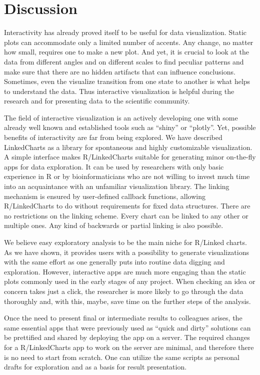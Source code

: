 \documentclass[twocolumn,10pt]{article}
\begin{document}
\section{Discussion}

Interactivity has already proved itself to be useful for data visualization. Static plots can accommodate only a limited number of accents. Any change, no matter how small, requires one to make a new plot. And yet, it is crucial to look at the data from different angles and on different scales to find peculiar patterns and make sure that there are no hidden artifacts that can influence conclusions. Sometimes, even the visualize transition from one state to another is what helps to understand the data. Thus interactive visualization is helpful during the research and for presenting data to the scientific community.

The field of interactive visualization is an actively developing one with some already well known and established tools such as ``shiny'' \citep{shiny} or ``plotly''\citep{sievert_2020}. Yet, possible benefits of interactivity are far from being explored. We have described LinkedCharts as a library for spontaneous and highly customizable visualization. A simple interface makes R/LinkedCharts suitable for generating minor on-the-fly apps for data exploration. It can be used by researchers with only basic experience in R or by bioinformaticians who are not willing to invest much time into an acquaintance with an unfamiliar visualization library. The linking mechanism is ensured by user-defined callback functions, allowing R/LinkedCharts to do without requirements for fixed data structures. There are no restrictions on the linking scheme. Every chart can be linked to any other or multiple ones. Any kind of backwards or partial linking is also possible.

We believe easy exploratory analysis to be the main niche for R/Linked charts. As we have shown, it provides users with a possibility to generate visualizations with the same effort as one generally puts into routine data digging and exploration. However, interactive apps are much more engaging than the static plots commonly used in the early stages of any project. When checking an idea or concern takes just a click, the researcher is more likely to go through the data thoroughly and, with this, maybe, save time on the further steps of the analysis.

Once the need to present final or intermediate results to colleagues arises, the same essential apps that were previously used as ``quick and dirty'' solutions can be prettified and shared by deploying the app on a server. The required changes for a R/LinkedCharts app to work on the server are minimal, and therefore there is no need to start from scratch. One can utilize the same scripts as personal drafts for exploration and as a basis for result presentation.
\end{document}
